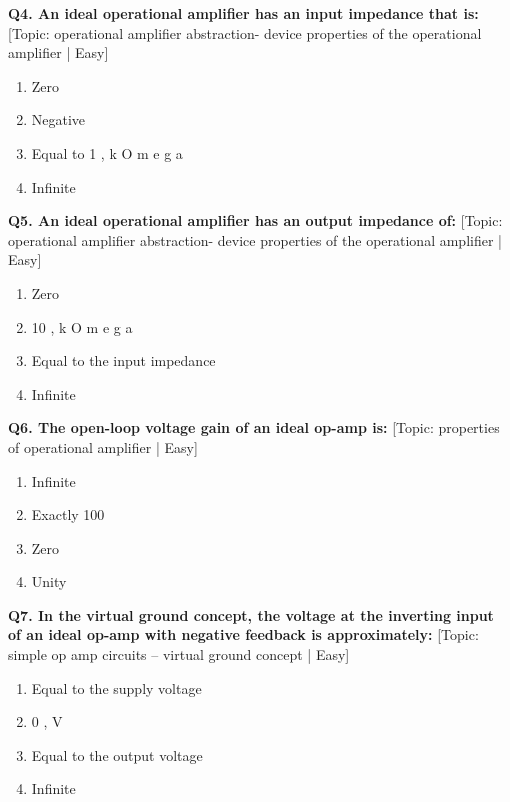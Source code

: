 \noindent\textbf{Q4. An ideal operational amplifier has an input impedance that is:} \hfill [Topic: operational amplifier abstraction- device properties of the operational amplifier | Easy]
\begin{enumerate}[label=(\alph*),topsep=2pt,itemsep=1pt,partopsep=0pt,parsep=0pt]
    \item {Zero}
    \item {Negative}
    \item {Equal to 1 , k O m e g a}
    \item {Infinite}
\end{enumerate}
\vspace{2mm}

\noindent\textbf{Q5. An ideal operational amplifier has an output impedance of:} \hfill [Topic: operational amplifier abstraction- device properties of the operational amplifier | Easy]
\begin{enumerate}[label=(\alph*),topsep=2pt,itemsep=1pt,partopsep=0pt,parsep=0pt]
    \item {Zero}
    \item {10 , k O m e g a}
    \item {Equal to the input impedance}
    \item {Infinite}
\end{enumerate}
\vspace{2mm}

\noindent\textbf{Q6. The open-loop voltage gain of an ideal op-amp is:} \hfill [Topic: properties of operational amplifier | Easy]
\begin{enumerate}[label=(\alph*),topsep=2pt,itemsep=1pt,partopsep=0pt,parsep=0pt]
    \item {Infinite}
    \item {Exactly 100}
    \item {Zero}
    \item {Unity}
\end{enumerate}
\vspace{2mm}

\noindent\textbf{Q7. In the virtual ground concept, the voltage at the inverting input of an ideal op-amp with negative feedback is approximately:} \hfill [Topic: simple op amp circuits -- virtual ground concept | Easy]
\begin{enumerate}[label=(\alph*),topsep=2pt,itemsep=1pt,partopsep=0pt,parsep=0pt]
    \item {Equal to the supply voltage}
    \item {0 , V}
    \item {Equal to the output voltage}
    \item {Infinite}
\end{enumerate}
\vspace{2mm}

